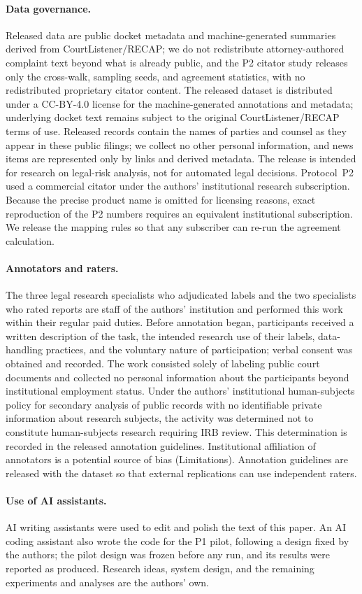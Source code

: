 \paragraph{Data governance.}
Released data are public docket metadata and machine-generated summaries derived from CourtListener/RECAP; we do not redistribute attorney-authored complaint text beyond what is already public, and the P2 citator study releases only the cross-walk, sampling seeds, and agreement statistics, with no redistributed proprietary citator content.
The released dataset is distributed under a CC-BY-4.0 license for the machine-generated annotations and metadata; underlying docket text remains subject to the original CourtListener/RECAP terms of use.
Released records contain the names of parties and counsel as they appear in these public filings; we collect no other personal information, and news items are represented only by links and derived metadata.
The release is intended for research on legal-risk analysis, not for automated legal decisions.
Protocol~P2 used a commercial citator under the authors' institutional research subscription.
Because the precise product name is omitted for licensing reasons, exact reproduction of the P2 numbers requires an equivalent institutional subscription.
We release the mapping rules so that any subscriber can re-run the agreement calculation.

\paragraph{Annotators and raters.}
The three legal research specialists who adjudicated labels and the two specialists who rated reports are staff of the authors' institution and performed this work within their regular paid duties.
Before annotation began, participants received a written description of the task, the intended research use of their labels, data-handling practices, and the voluntary nature of participation; verbal consent was obtained and recorded.
The work consisted solely of labeling public court documents and collected no personal information about the participants beyond institutional employment status.
Under the authors' institutional human-subjects policy for secondary analysis of public records with no identifiable private information about research subjects, the activity was determined not to constitute human-subjects research requiring IRB review.
This determination is recorded in the released annotation guidelines.
Institutional affiliation of annotators is a potential source of bias (Limitations).
Annotation guidelines are released with the dataset so that external replications can use independent raters.

\paragraph{Use of AI assistants.}
AI writing assistants were used to edit and polish the text of this paper.
An AI coding assistant also wrote the code for the P1 pilot, following a design fixed by the authors; the pilot design was frozen before any run, and its results were reported as produced.
Research ideas, system design, and the remaining experiments and analyses are the authors' own.
